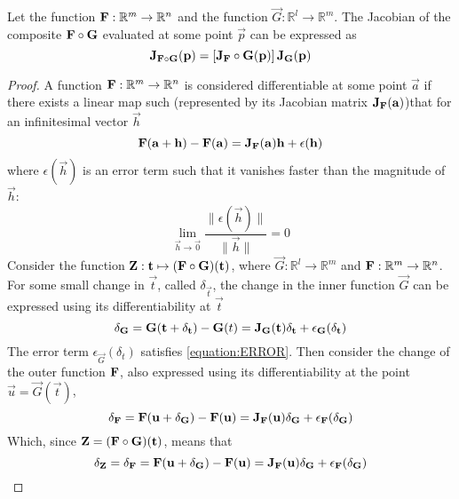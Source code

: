 \begin{lemma}
    Let the function $\mathbf{F}:\mathbb{R}^m\rightarrow\mathbb{R}^n$ and the function $\vec{G}:\mathbb{R}^l\rightarrow\mathbb{R}^m$. The Jacobian of the composite
    $\mathbf{F}\circ\mathbf{G}$ evaluated at some point $\vec{p}$ can be expressed as
    $$
        \mathbf{J}_{\mathbf{F}\circ\mathbf{G}}(\mathbf{p})=\left[\mathbf{J}_{\mathbf{F}}\circ\mathbf{G}(\mathbf{p})\right]\mathbf{J}_{\mathbf{G}}(\mathbf{p})
    $$
    \begin{proof}
        A function $\mathbf{F}:\mathbb{R}^m\rightarrow\mathbb{R}^n$ is considered differentiable at some point $\vec{a}$ if there exists a linear map such (represented by its
        Jacobian matrix $\mathbf{J}_{\mathbf{F}}(\mathbf{a})$)that for an infinitesimal vector $\vec{h}$
        $$
            \mathbf{F}(\mathbf{a}+\mathbf{h})-\mathbf{F}(\mathbf{a})=\mathbf{J}_{\mathbf{F}}(\mathbf{a})\mathbf{h}+\epsilon(\mathbf{h})
        $$
        where $\epsilon(\vec{h})$ is an error term such that it vanishes faster than the magnitude of $\vec{h}$:
        \begin{equation}
            \label{equation:ERROR}\lim_{\vec{h}\rightarrow\vec{0}}\frac{\lVert\epsilon(\vec{h})\rVert}{\lVert\vec{h}\rVert}=0
        \end{equation}
        Consider the function $\mathbf{Z}:\mathbf{t}\mapsto(\mathbf{F}\circ \mathbf{G})(\mathbf{t})$, where $\vec{G}:\mathbb{R}^l\rightarrow\mathbb{R}^m$ and $\mathbf{F}:\mathbb{R}^m\rightarrow\mathbb{R}^n$. For
        some small change in $\vec{t}$, called $\delta_\vec{t}$, the change in the inner function $\vec{G}$ can be expressed using its differentiability at $\vec{t}$
        \begin{equation}
            \label{equation:jacobian-chain-rule:1}\delta_{\mathbf{G}}=\mathbf{G}(\mathbf{t}+\delta_{\mathbf{t}})-\mathbf{G}(t)=\mathbf{J}_{\mathbf{G}}(\mathbf{t})\delta_{\mathbf{t}}+\epsilon_{\mathbf{G}}(\delta_{\mathbf{t}})
        \end{equation}
        The error term $\epsilon_\vec{G}(\delta_t)$ satisfies \eqref{equation:ERROR}. Then consider the change of the outer function $\mathbf{F}$, also expressed using its differentiability
        at the point $\vec{u}=\vec{G}(\vec{t})$,
        $$
            \delta_{\mathbf{F}}=\mathbf{F}(\mathbf{u}+\delta_{\mathbf{G}})-\mathbf{F}(\mathbf{u})=\mathbf{J}_{\mathbf{F}}(\mathbf{u})\delta_{\mathbf{G}}+\epsilon_{\mathbf{F}}(\delta_{\mathbf{G}})
        $$
        Which, since $\mathbf{Z}=(\mathbf{F}\circ\mathbf{G})(\mathbf{t})$, means that
        \begin{equation}
            \label{equation:jacobian-chain-rule:2}\delta_\vec{Z}=\delta_\fatf=\fatf(\vec{u}+\delta_\vec{G})-\fatf(\vec{u})=\jacobian_\fatf(\vec{u})\delta_\vec{G}+\epsilon_\fatf(\delta_\vec{G})

\end{equation}
\end{proof}
\end{lemma}

